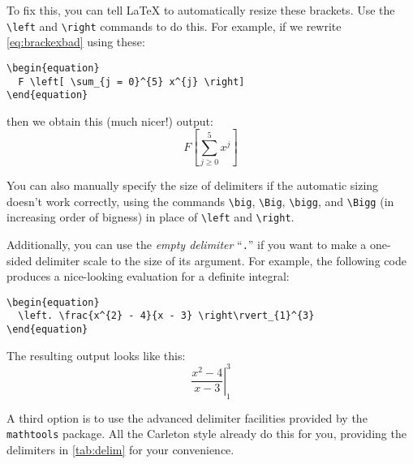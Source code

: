 \documentclass{article}
\newcommand*{\code}[1]{\texttt{#1}}
\begin{document}
To fix this, you can tell \LaTeX{} to automatically resize these brackets.
Use the \code{\textbackslash{}left} and \code{\textbackslash{}right} commands to do this.
For example, if we rewrite \cref{eq:brackexbad} using these:
\begin{verbatim}
\begin{equation}
  F \left[ \sum_{j = 0}^{5} x^{j} \right]
\end{equation}
\end{verbatim}
then we obtain this (much nicer!) output:
\begin{equation}
  \label{eq:brackexgood}
  F \left[ \sum_{j \geq 0}^{5} x^{j} \right]
\end{equation}

You can also manually specify the size of delimiters if the automatic sizing doesn't work correctly, using the commands \code{\textbackslash{}big}, \code{\textbackslash{}Big}, \code{\textbackslash{}bigg}, and \code{\textbackslash{}Bigg} (in increasing order of bigness) in place of \code{\textbackslash{}left} and \code{\textbackslash{}right}.

Additionally, you can use the \emph{empty delimiter} \enquote{\code{.}} if you want to make a one-sided delimiter scale to the size of its argument.
For example, the following code produces a nice-looking evaluation for a definite integral:
\begin{verbatim}
\begin{equation}
  \left. \frac{x^{2} - 4}{x - 3} \right\rvert_{1}^{3}
\end{equation}
\end{verbatim}
The resulting output looks like this:
\begin{equation}
  \label{eq:evalex}
  \left. \frac{x^{2} - 4}{x - 3} \right\rvert_{1}^{3}
\end{equation}

A third option is to use the advanced delimiter facilities provided by the \code{mathtools} package.
All the Carleton style already do this for you, providing the delimiters in \cref{tab:delim} for your convenience.
\end{document}
